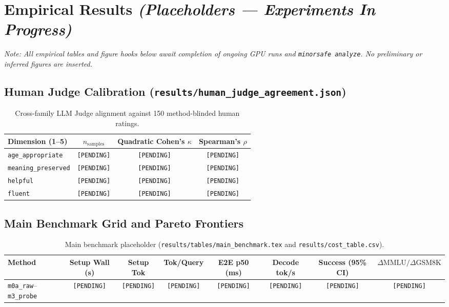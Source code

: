 \documentclass[11pt,letterpaper]{article}
\begin{document}
\section{Empirical Results \textit{(Placeholders --- Experiments In Progress)}}

\noindent\textit{Note: All empirical tables and figure hooks below await completion of ongoing GPU runs and \texttt{minorsafe analyze}. No preliminary or inferred figures are inserted.}

\subsection{Human Judge Calibration (\texttt{results/human\_judge\_agreement.json})}
\begin{table}[ht]
\centering
\caption{Cross-family LLM Judge alignment against 150 method-blinded human ratings.}
\label{tab:human_agreement}
\begin{tabular}{lccc}
\toprule
\textbf{Dimension (1--5)} & \textbf{$n_{\text{samples}}$} & \textbf{Quadratic Cohen's $\kappa$} & \textbf{Spearman's $\rho$} \\
\midrule
\texttt{age\_appropriate} & \texttt{[PENDING]} & \texttt{[PENDING]} & \texttt{[PENDING]} \\
\texttt{meaning\_preserved} & \texttt{[PENDING]} & \texttt{[PENDING]} & \texttt{[PENDING]} \\
\texttt{helpful} & \texttt{[PENDING]} & \texttt{[PENDING]} & \texttt{[PENDING]} \\
\texttt{fluent} & \texttt{[PENDING]} & \texttt{[PENDING]} & \texttt{[PENDING]} \\
\bottomrule
\end{tabular}
\end{table}

\subsection{Main Benchmark Grid and Pareto Frontiers}
% 
\begin{table}[ht]
\centering
\caption{Main benchmark placeholder (\texttt{results/tables/main\_benchmark.tex} and \texttt{results/cost\_table.csv}).}
\label{tab:main_placeholder}
\begin{tabular}{lccccccc}
\toprule
\textbf{Method} & \textbf{Setup Wall (s)} & \textbf{Setup Tok} & \textbf{Tok/Query} & \textbf{E2E p50 (ms)} & \textbf{Decode tok/s} & \textbf{Success (95\% CI)} & \textbf{$\Delta\text{MMLU}/\Delta\text{GSM8K}$} \\
\midrule
\texttt{m0a\_raw}--\texttt{m3\_probe} & \texttt{[PENDING]} & \texttt{[PENDING]} & \texttt{[PENDING]} & \texttt{[PENDING]} & \texttt{[PENDING]} & \texttt{[PENDING]} & \texttt{[PENDING]} \\
\bottomrule
\end{tabular}
\end{table}
\end{document}
